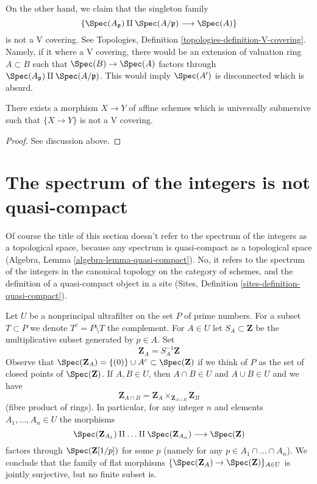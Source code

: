 \medskip\noindent
On the other hand, we claim that the singleton family
$$
\{\Spec(A_\mathfrak p) \amalg \Spec(A/\mathfrak p) \longrightarrow \Spec(A)\}
$$
is not a V covering. See
Topologies, Definition \ref{topologies-definition-V-covering}.
Namely, if it where a V covering, there would
be an extension of valuation ring $A \subset B$ such that
$\Spec(B) \to \Spec(A)$ factors through
$\Spec(A_\mathfrak p) \amalg \Spec(A/\mathfrak p)$.
This would imply $\Spec(A')$ is disconnected which is absurd.

\begin{lemma}
\label{lemma-universally-submersive-not-V}
There exists a morphism $X \to Y$ of affine schemes
which is universally submersive such that $\{X \to Y\}$
is not a V covering.
\end{lemma}

\begin{proof}
See discussion above.
\end{proof}









\section{The spectrum of the integers is not quasi-compact}
\label{section-canonical}

\noindent
Of course the title of this section doesn't refer to
the spectrum of the integers as a topological space,
because any spectrum is quasi-compact as a topological space
(Algebra, Lemma \ref{algebra-lemma-quasi-compact}).
No, it refers to the spectrum of the integers in the
canonical topology on the category of schemes, and the
definition of a quasi-compact object in a site
(Sites, Definition \ref{sites-definition-quasi-compact}).

\medskip\noindent
Let $U$ be a nonprincipal ultrafilter on the set $P$ of prime numbers.
For a subset $T \subset P$ we denote $T^c = P \setminus T$ the complement.
For $A \in U$ let $S_A \subset \mathbf{Z}$ be the multiplicative
subset generated by $p \in A$. Set
$$
\mathbf{Z}_A = S_A^{-1}\mathbf{Z}
$$
Observe that $\Spec(\mathbf{Z}_A) = \{(0)\} \cup A^c \subset \Spec(\mathbf{Z})$
if we think of $P$ as the set of closed points of $\Spec(\mathbf{Z})$.
If $A, B \in U$, then $A \cap B \in U$ and $A \cup B \in U$
and we have
$$
\mathbf{Z}_{A \cap B} =
\mathbf{Z}_A \times_{\mathbf{Z}_{A \cup B}} \mathbf{Z}_B
$$
(fibre product of rings). In particular, for any
integer $n$ and elements $A_1, \ldots, A_n \in U$ the morphisms
$$
\Spec(\mathbf{Z}_{A_1}) \amalg \ldots \amalg \Spec(\mathbf{Z}_{A_n})
\longrightarrow \Spec(\mathbf{Z})
$$
factors through $\Spec(\mathbf{Z}[1/p])$ for some $p$
(namely for any $p \in A_1 \cap \ldots \cap A_n$).
We conclude that the family of flat morphisms
$\{\Spec(\mathbf{Z}_A) \to \Spec(\mathbf{Z})\}_{A \in U}$ is jointly
surjective, but no finite subset is.

